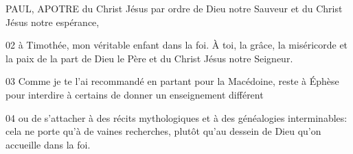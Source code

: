 PAUL, APOTRE du Christ Jésus par ordre de Dieu notre Sauveur et du Christ Jésus notre espérance,

02 à Timothée, mon véritable enfant dans la foi. À toi, la grâce, la miséricorde et la paix de la part de Dieu le Père et du Christ Jésus notre Seigneur.

03 Comme je te l’ai recommandé en partant pour la Macédoine, reste à Éphèse pour interdire à certains de donner un enseignement différent

04 ou de s’attacher à des récits mythologiques et à des généalogies interminables: cela ne porte qu’à de vaines recherches, plutôt qu’au dessein de Dieu qu’on accueille dans la foi.
